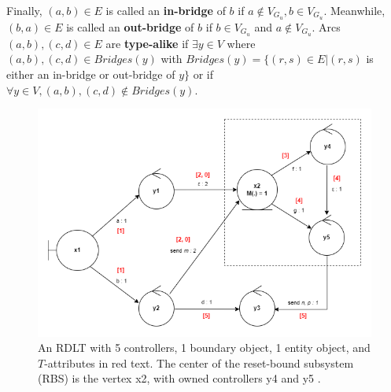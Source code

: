 \documentclass[12pt]{article}
\begin{document}
\begin{definition}
\begin{itemize}
        Finally, $(a,b) \in E$ is called an \textbf{in-bridge} of $b$ if $a \notin V_{G_{u}}, b \in V_{G_{u}}$. Meanwhile, $(b,a) \in E$ is called an \textbf{out-bridge} of $b$ if $b \in V_{G_{u}}$ and $a \notin V_{G_{u}}$. Arcs $(a,b), (c,d) \in E$ are \textbf{type-alike} if $\exists y \in V$ where $(a,b), (c,d) \in Bridges(y)$ with $Bridges(y) = \{(r,s) \in E|(r,s)$ is either an in-bridge or out-bridge of $y\}$ or if $\forall y \in V, (a,b), (c,d) \notin Bridges(y)$.

    \end{itemize}

    \end{definition}

    \begin{figure}[h]
        \centering
        \includegraphics[scale=0.65]{figures/RDLT1.png}
        \caption{An RDLT with 5 controllers, 1 boundary object, 1 entity object, and $T$-attributes in red text. The center of the reset-bound subsystem (RBS) is the vertex x2, with owned controllers y4 and y5 \cite{yiu}.}
        \label{rdlt1}
    \end{figure} \par
\end{document}
